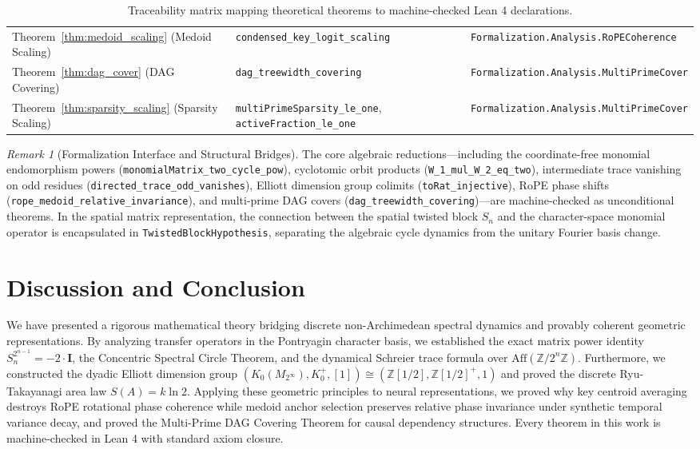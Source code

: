 \documentclass[11pt,reqno]{article}
\theoremstyle{plain}
\theoremstyle{definition}
\theoremstyle{remark}
\newtheorem{remark}[theorem]{Remark}
\newcommand{\Z}{\mathbb{Z}}
\newcommand{\Aff}{\mathrm{Aff}}
\begin{document}
\begin{table}[h!]
\begin{tabular}{lll}
Theorem~\ref{thm:medoid_scaling} (Medoid Scaling) & \texttt{condensed\_key\_logit\_scaling} & \texttt{Formalization.Analysis.RoPECoherence} \\
Theorem~\ref{thm:dag_cover} (DAG Covering) & \texttt{dag\_treewidth\_covering} & \texttt{Formalization.Analysis.MultiPrimeCover} \\
Theorem~\ref{thm:sparsity_scaling} (Sparsity Scaling) & \texttt{multiPrimeSparsity\_le\_one}, \texttt{activeFraction\_le_one} & \texttt{Formalization.Analysis.MultiPrimeCover} \\
\bottomrule
\end{tabular}
\caption{Traceability matrix mapping theoretical theorems to machine-checked Lean 4 declarations.}
\end{table}

\begin{remark}[Formalization Interface and Structural Bridges]
The core algebraic reductions---including the coordinate-free monomial endomorphism powers (\texttt{monomialMatrix\_two\_cycle\_pow}), cyclotomic orbit products (\texttt{W\_1\_mul\_W\_2\_eq\_two}), intermediate trace vanishing on odd residues (\texttt{directed\_trace\_odd\_vanishes}), Elliott dimension group colimits (\texttt{toRat\_injective}), RoPE phase shifts (\texttt{rope\_medoid\_relative\_invariance}), and multi-prime DAG covers (\texttt{dag\_treewidth\_covering})---are machine-checked as unconditional theorems. In the spatial matrix representation, the connection between the spatial twisted block $S_n$ and the character-space monomial operator is encapsulated in \texttt{TwistedBlockHypothesis}, separating the algebraic cycle dynamics from the unitary Fourier basis change.
\end{remark}

\section{Discussion and Conclusion}

We have presented a rigorous mathematical theory bridging discrete non-Archimedean spectral dynamics and provably coherent geometric representations. By analyzing transfer operators in the Pontryagin character basis, we established the exact matrix power identity $S_n^{2^{n-1}} = -2 \cdot \mathbf{I}$, the Concentric Spectral Circle Theorem, and the dynamical Schreier trace formula over $\Aff(\Z/2^n\Z)$. Furthermore, we constructed the dyadic Elliott dimension group $(K_0(M_{2^\infty}), K_0^+, [1]) \cong (\Z[1/2], \Z[1/2]^+, 1)$ and proved the discrete Ryu-Takayanagi area law $S(A) = k \ln 2$. Applying these geometric principles to neural representations, we proved why key centroid averaging destroys RoPE rotational phase coherence while medoid anchor selection preserves relative phase invariance under synthetic temporal variance decay, and proved the Multi-Prime DAG Covering Theorem for causal dependency structures. Every theorem in this work is machine-checked in Lean 4 with standard axiom closure.
\end{document}
